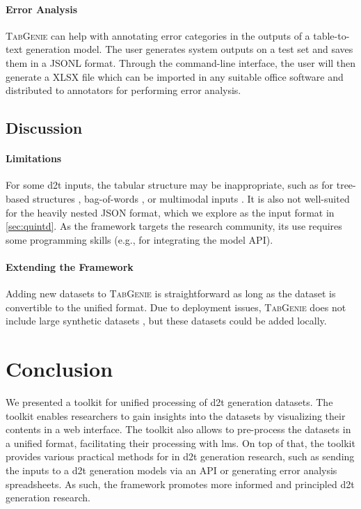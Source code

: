 \paragraph{Error Analysis} \textsc{TabGenie} can help with annotating error categories in the outputs of a table-to-text generation model. The user generates system outputs on a test set and saves them in a JSONL format. Through the command-line interface, the user will then generate a XLSX file which can be imported in any suitable office software and distributed to annotators for performing error analysis.

\subsection{Discussion}

\paragraph{Limitations} For some \ac{d2t} inputs, the tabular structure may be inappropriate, such as for tree-based structures \cite{balakrishnan2019constrained}, bag-of-words \cite{lin2019commongen}, or multimodal inputs \cite{krishna2017visual}. It is also not well-suited for the heavily nested JSON format, which we explore as the input format in \autoref{sec:quintd}. As the framework targets the research community, its use requires some programming skills (e.g., for integrating the model API).

\paragraph{Extending the Framework} Adding new datasets to \textsc{TabGenie} is straightforward as long as the dataset is convertible to the unified format. Due to deployment issues, \textsc{TabGenie} does not include large synthetic datasets \cite{agarwalKnowledgeGraphBased2021,jinGenWikiDatasetMillion2020}, but these datasets could be added locally.


\section{Conclusion}
We presented a toolkit for unified processing of \ac{d2t} generation datasets. The toolkit enables researchers to gain insights into the datasets by visualizing their contents in a web interface. The toolkit also allows to pre-process the datasets in a unified format, facilitating their processing with \acp{lm}. On top of that, the toolkit provides various practical methods for in \ac{d2t} generation research, such as sending the inputs to a \ac{d2t} generation models via an API or generating error analysis spreadsheets. As such, the framework promotes more informed and principled \ac{d2t} generation research.